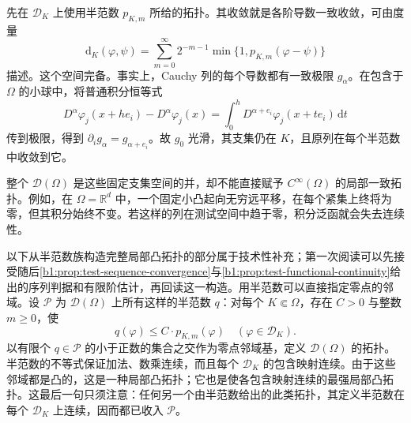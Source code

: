 先在 \(\mathcal D_K\) 上使用半范数 \(p_{K,m}\) 所给的拓扑。其收敛就是各阶导数一致收敛，可由度量
\[
 \mathrm{d}_K(\varphi,\psi)=\sum_{m=0}^\infty2^{-m-1}\min\{1,p_{K,m}(\varphi-\psi)\}
\]
描述。这个空间完备。事实上，Cauchy 列的每个导数都有一致极限 \(g_\alpha\)。在包含于 \(\Omega\) 的小球中，将普通积分恒等式
\[
 D^\alpha\varphi_j(x+he_i)-D^\alpha\varphi_j(x)
 =\int_0^h D^{\alpha+e_i}\varphi_j(x+te_i)\,\mathrm dt
\]
传到极限，得到 \(\partial_i g_\alpha=g_{\alpha+e_i}\)。故 \(g_0\) 光滑，其支集仍在 \(K\)，且原列在每个半范数中收敛到它。

\ProseParagraphBreak

整个 \(\mathcal D(\Omega)\) 是这些固定支集空间的并，却不能直接赋予 \(C^\infty(\Omega)\) 的局部一致拓扑。例如，在 \(\Omega=\mathbb R^d\) 中，一个固定小凸起向无穷远平移，在每个紧集上终将为零，但其积分始终不变。若这样的列在测试空间中趋于零，积分泛函就会失去连续性。

\ProseParagraphBreak

以下从半范数族构造完整局部凸拓扑的部分属于技术性补充；第一次阅读可以先接受随后\cref{b1:prop:test-sequence-convergence}与\cref{b1:prop:test-functional-continuity}给出的序列判据和有限阶估计，再回读这一构造。用半范数可以直接指定零点的邻域。设 \(\mathscr P\) 为 \(\mathcal D(\Omega)\) 上所有这样的半范数 \(q\)：对每个 \(K\Subset\Omega\)，存在 \(C>0\) 与整数 \(m\geq0\)，使
\[
 q(\varphi)\leq C\cdot p_{K,m}(\varphi)\quad(\varphi\in\mathcal D_K).
\]
以有限个 \(q\in\mathscr P\) 的小于正数的集合之交作为零点邻域基，定义 \(\mathcal D(\Omega)\) 的拓扑。半范数的不等式保证加法、数乘连续，而且每个 \(\mathcal D_K\) 的包含映射连续。由于这些邻域都是凸的，这是一种局部凸拓扑；它也是使各包含映射连续的最强局部凸拓扑。这最后一句只须注意：任何另一个由半范数给出的此类拓扑，其定义半范数在每个 \(\mathcal D_K\) 上连续，因而都已收入 \(\mathscr P\)。

